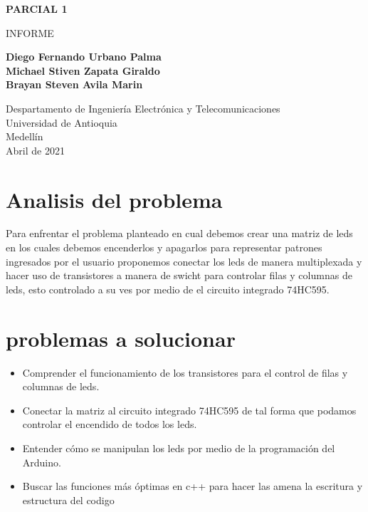 \documentclass{article}
\begin{document}
\begin{titlepage}
    \begin{center}
        \vspace*{1cm}
            
        \Huge
        \textbf{PARCIAL 1}
            
        \vspace{0.5cm}
        \LARGE
        INFORME
            
        \vspace{1.5cm}
            
        \textbf{Diego Fernando Urbano Palma\\Michael Stiven Zapata Giraldo\\Brayan Steven Avila Marin}
            
        \vfill
            
        \vspace{0.8cm}
            
        \Large
        Despartamento de Ingeniería Electrónica y Telecomunicaciones\\
        Universidad de Antioquia\\
        Medellín\\
        Abril de 2021
            
    \end{center}
\end{titlepage}

\tableofcontents
\newpage
\section{ Analisis del problema }\label{intro}
Para enfrentar el problema planteado en cual debemos crear una matriz de leds en los cuales debemos encenderlos y apagarlos para representar patrones ingresados por el usuario proponemos conectar los leds de manera multiplexada y hacer uso de transistores a manera de swicht para controlar filas y columnas de leds, esto controlado a su ves por medio de el circuito integrado 74HC595.
\section{ problemas a solucionar }
\begin{itemize}
\item Comprender el funcionamiento de los transistores para el control de filas y columnas de leds.
\item Conectar la matriz al circuito integrado 74HC595 de tal forma que podamos controlar el encendido de todos los leds.
\item Entender cómo se manipulan los leds por medio de la programación del Arduino.
\item Buscar las funciones más óptimas en c++ para hacer las amena la escritura y estructura del codigo



\end{itemize} 
\end{document}
